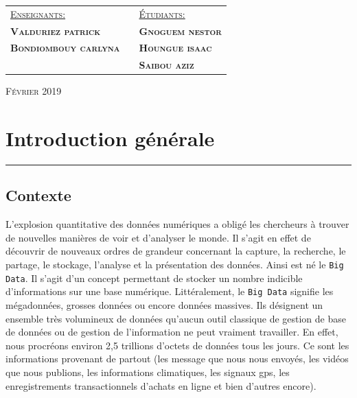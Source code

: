 \documentclass[12pt]{report}
\begin{document}
\begin{center}
		
	
		\vspace{3em}	
		\begin{tabular}{lll}
			\vspace{0.5em}
			 \textsc{\underline{Enseignants:}}	& \hspace{3em}	&	\textsc{\underline{Étudiants:}}		\\ 
			 \textsc{\textbf{\sc Valduriez patrick}} & \hspace{15em}	&	\textsc{\textbf{\sc Gnoguem nestor}}	 \\				%
			 \textsc{\textbf{\sc Bondiombouy carlyna}}	& \hspace{15em}	&	\textsc{\textbf{\sc Houngue isaac}}	 \\				%
													 	& \hspace{15em}	&	\textsc{\textbf{\sc Saibou aziz}}	 \\				%
		\end{tabular}

		\vspace{6.5em}																
		\textsc{\small Février 2019}
		
		
	\end{center}
	
	\newpage
	\tableofcontents
	
	\newpage

	\section{\sc Introduction générale}
	\rule{1 \textwidth}{0.5pt} \textbf{}
	\vspace{2em}

		\subsection{ \sc Contexte}
		L’explosion quantitative des données numériques a obligé les chercheurs à trouver de nouvelles
		manières de voir et d’analyser le monde. Il s’agit en effet de découvrir de nouveaux ordres de
		grandeur concernant la capture, la recherche, le partage, le stockage, l’analyse et la présentation des données. Ainsi est né le \texttt{Big Data}. Il s’agit d’un concept permettant de stocker un nombre indicible d’informations sur une base numérique. Littéralement, le \texttt{Big Data} signifie les mégadonnées, grosses données ou encore données massives.
		Ils désignent un ensemble très volumineux de données qu’aucun outil classique de gestion de base
		de données ou de gestion de l’information ne peut vraiment travailler.
		En effet, nous procréons environ 2,5 trillions d’octets de données tous les jours. Ce sont les informations provenant de partout (les message que nous nous envoyés, les vidéos que nous publions, les informations climatiques, les signaux {\sc gps}, les enregistrements transactionnels d’achats en ligne et bien
		d’autres encore).
\end{document}
